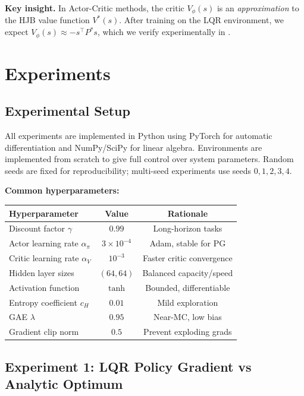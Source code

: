 \documentclass[11pt, a4paper]{article}
\newcommand{\T}{\top}
\begin{document}
\textbf{Key insight.}
In Actor-Critic methods, the critic $V_\phi(s)$ is an \emph{approximation} to
the HJB value function $V^*(s)$. After training on the LQR environment, we
expect $V_\phi(s) \approx -s^\T P^* s$, which we verify experimentally in
.

\section{Experiments}
\label{sec:experiments}

\subsection{Experimental Setup}

All experiments are implemented in Python using PyTorch \citep{paszke2019} for
automatic differentiation and NumPy/SciPy for linear algebra.
Environments are implemented from scratch to give full control over system
parameters.
Random seeds are fixed for reproducibility; multi-seed experiments use seeds
$0, 1, 2, 3, 4$.

\textbf{Common hyperparameters:}
\begin{center}
\begin{tabular}{lcc}
\toprule
Hyperparameter & Value & Rationale \\
\midrule
Discount factor $\gamma$ & $0.99$ & Long-horizon tasks \\
Actor learning rate $\alpha_\pi$ & $3 \times 10^{-4}$ & Adam, stable for PG \\
Critic learning rate $\alpha_V$ & $10^{-3}$ & Faster critic convergence \\
Hidden layer sizes & $(64, 64)$ & Balanced capacity/speed \\
Activation function & $\tanh$ & Bounded, differentiable \\
Entropy coefficient $c_H$ & $0.01$ & Mild exploration \\
GAE $\lambda$ & $0.95$ & Near-MC, low bias \\
Gradient clip norm & $0.5$ & Prevent exploding grads \\
\bottomrule
\end{tabular}
\end{center}

\subsection{Experiment 1: LQR Policy Gradient vs Analytic Optimum}
\label{sec:exp1}
\end{document}
